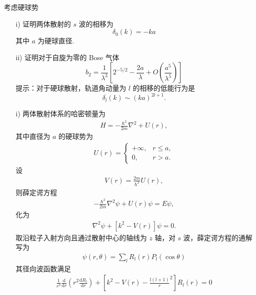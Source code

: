 \documentclass{assignment}
\begin{document}
\begin{prob}
    考虑硬球势
    \begin{itemize}
        \item[i)] 证明两体散射的 $s$ 波的相移为
        \[
            \delta_0(k)=-ka
        \]
        其中 $a$ 为硬球直径.
        \item[ii)] 证明对于自旋为零的 Bose 气体
        \[
            b_2=\frac{1}{\lambda^3}\left[2^{-5/2}-\frac{2a}{\lambda}+O\left(\frac{a^5}{\lambda^5}\right)\right]
        \]
        提示：对于硬球散射，轨道角动量为 $l$ 的相移的低能行为是
        \[
            \delta_l(k)\sim(ka)^{2l+1}.
        \]
    \end{itemize}
\end{prob}
\begin{sol}
    \begin{itemize}
        \item[i)] 
        两体散射体系的哈密顿量为
        \begin{align}
            H=-\frac{\hbar^2}{2m}\nabla^2+U(r),
        \end{align}
        其中直径为 $a$ 的硬球势为
        \begin{align}
            U(r)=\left\{\begin{array}{ll}
                +\infty,&r\leq a,\\
                0,&r>a.
            \end{array}\right.
        \end{align}
        设
        \begin{align}
            V(r)=\frac{2m}{\hbar^2}U(r),
        \end{align}
        则薛定谔方程
        \begin{align}
            -\frac{\hbar^2}{2m}\nabla^2\psi+U(r)\psi=E\psi,
        \end{align}
        化为
        \begin{align}
            \nabla^2\psi+[k^2-V(r)]\psi=0.
        \end{align}
        取沿粒子入射方向且通过散射中心的轴线为 $z$ 轴，对 $s$ 波，薛定谔方程的通解写为
        \begin{align}
            \psi(r,\theta)=\sum_lR_l(r)P_l(\cos\theta)
        \end{align}
        其径向波函数满足
        \begin{align}
            \frac{1}{r^2}\frac{\mathrm{d}}{\mathrm{d}r}\left(r^2\frac{\mathrm{d}R_l}{\mathrm{d}r}\right)+\left[k^2-V(r)-\frac{l(l+1)}{r}^2\right]R_l(r)=0
        \end{align}

\end{itemize}
\end{sol}
\end{document}
